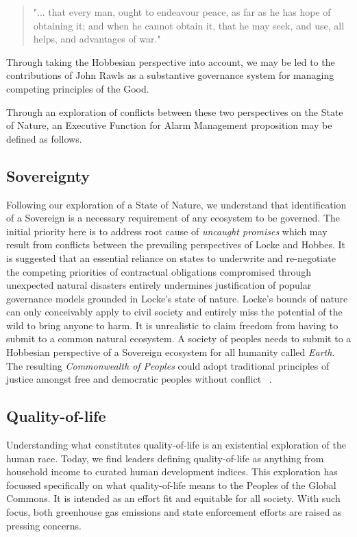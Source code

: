 \documentclass[11pt, oneside]{article}   	%
\begin{document}
\begin{quote}
"... that every man, ought to endeavour peace, as far as he has hope of obtaining it; and when he cannot obtain it, that he may seek, and use, all helps, and advantages of war."
\end{quote}
Through taking the Hobbesian perspective into account, we may be led to the contributions of John Rawls as a substantive governance system for managing competing principles of the Good.\

Through an exploration of conflicts between these two perspectives on the State of Nature, an Executive Function for Alarm Management proposition may be defined as follows.\

\subsection{Sovereignty}
Following our exploration of a State of Nature, we understand that identification of a Sovereign is a necessary requirement of any ecosystem to be governed.
The initial priority here is to address root cause of \emph{uncaught promises} which may result from conflicts between the prevailing perspectives of Locke and Hobbes.
It is suggested that an essential reliance on states to underwrite and re-negotiate the competing priorities of contractual obligations compromised through unexpected natural disasters entirely undermines justification of popular governance models grounded in Locke's state of nature.
Locke's bounds of nature can only conceivably apply to civil society and entirely miss the potential of the wild to bring anyone to harm.
It is unrealistic to claim freedom from having to submit to a common natural ecosystem.
A society of peoples needs to submit to a Hobbesian perspective of a Sovereign ecosystem for all humanity called \emph{Earth}.
The resulting \emph{Commonwealth of Peoples} could adopt traditional principles of justice amongst free and democratic peoples without conflict ~\cite{jr2}.\

\subsection{Quality-of-life}
Understanding what constitutes quality-of-life is an existential exploration of the human race.
Today, we find leaders defining quality-of-life as anything from household income to curated human development indices.
This exploration has focussed specifically on what quality-of-life means to the Peoples of the Global Commons.
It is intended as an effort fit and equitable for all society.
With such focus, both greenhouse gas emissions and state enforcement efforts are raised as pressing concerns.
\end{document}
